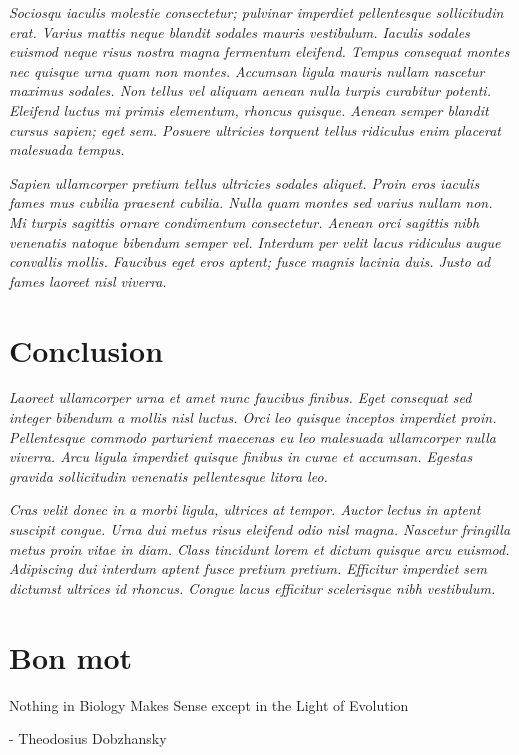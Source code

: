 \documentclass[
  10pt,
  a4paper,
]{scrbook}
\renewenvironment{quote}{\begin{myquote}}{\end{myquote}}
\let\oldemph\emph
\renewcommand\emph[1]{\oldemph{\color{gray}#1}} %
\begin{document}
\emph{Sociosqu iaculis molestie consectetur; pulvinar imperdiet
pellentesque sollicitudin erat. Varius mattis neque blandit sodales
mauris vestibulum. Iaculis sodales euismod neque risus nostra magna
fermentum eleifend. Tempus consequat montes nec quisque urna quam non
montes. Accumsan ligula mauris nullam nascetur maximus sodales. Non
tellus vel aliquam aenean nulla turpis curabitur potenti. Eleifend
luctus mi primis elementum, rhoncus quisque. Aenean semper blandit
cursus sapien; eget sem. Posuere ultricies torquent tellus ridiculus
enim placerat malesuada tempus.}

\emph{Sapien ullamcorper pretium tellus ultricies sodales aliquet. Proin
eros iaculis fames mus cubilia praesent cubilia. Nulla quam montes sed
varius nullam non. Mi turpis sagittis ornare condimentum consectetur.
Aenean orci sagittis nibh venenatis natoque bibendum semper vel.
Interdum per velit lacus ridiculus augue convallis mollis. Faucibus eget
eros aptent; fusce magnis lacinia duis. Justo ad fames laoreet nisl
viverra.}

\chapter{Conclusion}\label{conclusion}

\emph{Laoreet ullamcorper urna et amet nunc faucibus finibus. Eget
consequat sed integer bibendum a mollis nisl luctus. Orci leo quisque
inceptos imperdiet proin. Pellentesque commodo parturient maecenas eu
leo malesuada ullamcorper nulla viverra. Arcu ligula imperdiet quisque
finibus in curae et accumsan. Egestas gravida sollicitudin venenatis
pellentesque litora leo.}

\emph{Cras velit donec in a morbi ligula, ultrices at tempor. Auctor
lectus in aptent suscipit congue. Urna dui metus risus eleifend odio
nisl magna. Nascetur fringilla metus proin vitae in diam. Class
tincidunt lorem et dictum quisque arcu euismod. Adipiscing dui interdum
aptent fusce pretium pretium. Efficitur imperdiet sem dictumst ultrices
id rhoncus. Congue lacus efficitur scelerisque nibh vestibulum.}

\chapter{Bon mot}\label{bon-mot}

\begin{quote}
Nothing in Biology Makes Sense except in the Light of Evolution

- Theodosius Dobzhansky
\end{quote}
\end{document}
